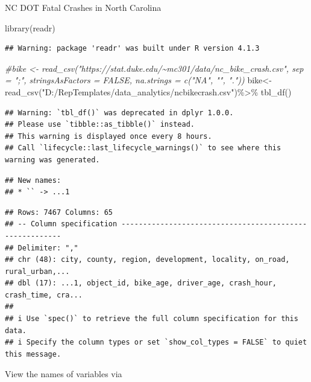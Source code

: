 \documentclass[
  ignorenonframetext,
]{beamer}
\newenvironment{Shaded}{\begin{snugshade}}{\end{snugshade}}
\newcommand{\CommentTok}[1]{\textcolor[rgb]{0.56,0.35,0.01}{\textit{#1}}}
\newcommand{\FunctionTok}[1]{\textcolor[rgb]{0.00,0.00,0.00}{#1}}
\newcommand{\NormalTok}[1]{#1}
\newcommand{\OtherTok}[1]{\textcolor[rgb]{0.56,0.35,0.01}{#1}}
\newcommand{\SpecialCharTok}[1]{\textcolor[rgb]{0.00,0.00,0.00}{#1}}
\newcommand{\StringTok}[1]{\textcolor[rgb]{0.31,0.60,0.02}{#1}}
\begin{document}
\begin{frame}[fragile]{NC DOT Fatal Crashes in North Carolina}
\protect\hypertarget{nc-dot-fatal-crashes-in-north-carolina}{}
\begin{Shaded}
\begin{Highlighting}[]
\FunctionTok{library}\NormalTok{(readr)}
\end{Highlighting}
\end{Shaded}

\begin{verbatim}
## Warning: package 'readr' was built under R version 4.1.3
\end{verbatim}

\begin{Shaded}
\begin{Highlighting}[]
\CommentTok{\#bike \textless{}{-} read\_csv("https://stat.duke.edu/\textasciitilde{}mc301/data/nc\_bike\_crash.csv",                  sep = ";", stringsAsFactors = FALSE, na.strings = c("NA", "", "."))}
\NormalTok{bike}\OtherTok{\textless{}{-}} \FunctionTok{read\_csv}\NormalTok{(}\StringTok{"D:/RepTemplates/data\_analytics/ncbikecrash.csv"}\NormalTok{)}\SpecialCharTok{\%\textgreater{}\%}
  \FunctionTok{tbl\_df}\NormalTok{()}
\end{Highlighting}
\end{Shaded}

\begin{verbatim}
## Warning: `tbl_df()` was deprecated in dplyr 1.0.0.
## Please use `tibble::as_tibble()` instead.
## This warning is displayed once every 8 hours.
## Call `lifecycle::last_lifecycle_warnings()` to see where this warning was generated.
\end{verbatim}

\begin{verbatim}
## New names:
## * `` -> ...1
\end{verbatim}

\begin{verbatim}
## Rows: 7467 Columns: 65
## -- Column specification --------------------------------------------------------
## Delimiter: ","
## chr (48): city, county, region, development, locality, on_road, rural_urban,...
## dbl (17): ...1, object_id, bike_age, driver_age, crash_hour, crash_time, cra...
## 
## i Use `spec()` to retrieve the full column specification for this data.
## i Specify the column types or set `show_col_types = FALSE` to quiet this message.
\end{verbatim}

View the names of variables via


\end{frame}
\end{document}
